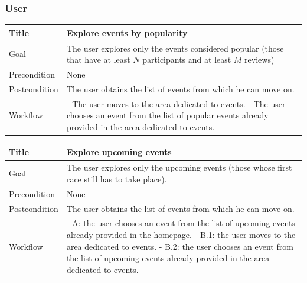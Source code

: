 \documentclass{beamer}
\begin{document}
\begin{frame}
    \frametitle{User}
    \begin{table}
        \tiny
        \begin{tabular}{|p{2cm}|p{6cm}|}
        \hline
        Title & \textbf{Explore events by popularity} \\
        \hline
        Goal & The user explores only the events considered popular (those that have
        at least $N$ participants and at least $M$ reviews) \\
        \hline
        Precondition & None \\
        \hline
        Postcondition & The user obtains the list of events from which he can move on.\\
        \hline
        Workflow &
        - The user moves to the area dedicated to events. \newline
        - The user chooses an event from the list of popular events already provided in the area
        dedicated to events. \\
        \hline
        \end{tabular}
\end{table}

\begin{table}
    \tiny
    \begin{tabular}{|p{2cm}|p{6cm}|}
    \hline
    Title & \textbf{Explore upcoming events} \\
    \hline
    Goal & The user explores only the upcoming events (those whose first race still has to take place). \\
    \hline
    Precondition & None \\
    \hline
    Postcondition & The user obtains the list of events from which he can move on.\\
    \hline
    Workflow &
    - A: the user chooses an event from the list of upcoming events already provided in the homepage. \newline
    - B.1: the user moves to the area dedicated to events. \newline
    - B.2: the user chooses an event from the list of upcoming events already provided in the area dedicated
    to events. \\
    \hline
    \end{tabular}
\end{table}
\end{frame}

\end{document}
